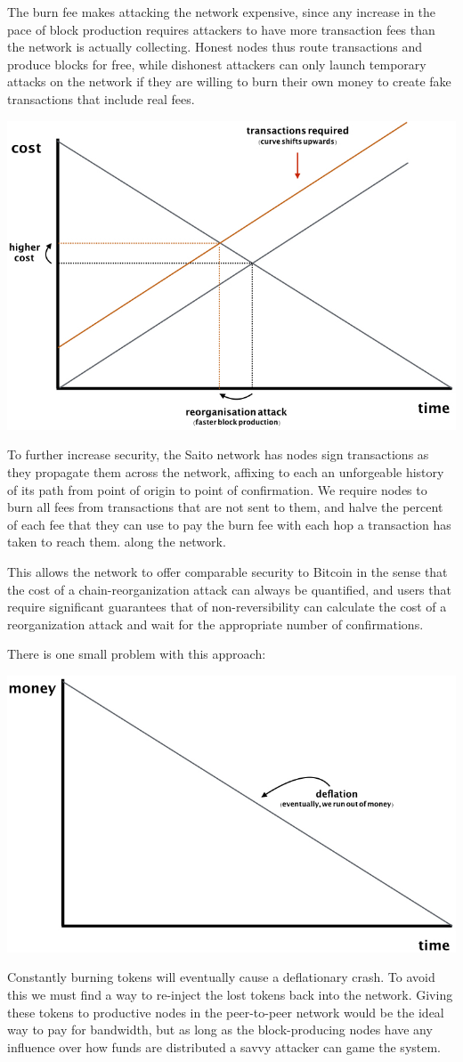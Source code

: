 \documentclass[11.5pt, oneside]{article}   	%
\begin{document}
\begin{multicols}{2}
The burn fee makes attacking the network expensive, since any increase in the pace of block production requires attackers to have more transaction fees than the network is actually collecting. Honest nodes thus route transactions and produce blocks for free, while dishonest attackers can only launch temporary attacks on the network if they are willing to burn their own money to create fake transactions that include real fees. 

\includegraphics[width=.45\textwidth]{saito3.jpeg}

To further increase security, the Saito network has nodes sign transactions as they propagate them across the network, affixing to each an unforgeable history of its path from point of origin to point of confirmation. We require nodes to burn all fees from transactions that are not sent to them, and halve the percent of each fee that they can use to pay the burn fee with each hop a transaction has taken to reach them. along the network.

This allows the network to offer comparable security to Bitcoin in the sense that the cost of a chain-reorganization attack can always be quantified, and users that require significant guarantees that of non-reversibility can calculate the cost of a reorganization attack and wait for the appropriate number of confirmations.

There is one small problem with this approach:

\includegraphics[width=.45\textwidth]{saito4.jpeg}

Constantly burning tokens will eventually cause a deflationary crash. To avoid this we must find a way to re-inject the lost tokens back into the network. Giving these tokens to productive nodes in the peer-to-peer network would be the ideal way to pay for bandwidth, but as long as the block-producing nodes have any influence over how funds are distributed a savvy attacker can game the system.


\end{multicols}
\end{document}

